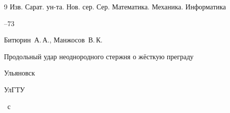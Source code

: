 \begin{thebibliography}{9}
\jour Изв. Сарат. ун-та. Нов. сер. Сер. Математика. Механика. Информатика




--73




\by Битюрин~А.\,А., Манжосов~В.\,К.

\book Продольный удар неоднородного стержня о жёсткую преграду

\publaddr Ульяновск

\publ УлГТУ


~с



\end{thebibliography}





\makeengtitlem





%

